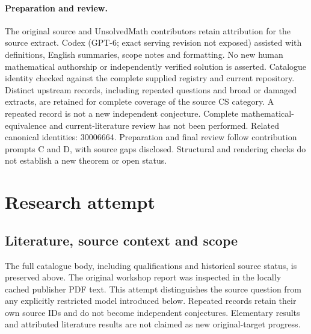 \documentclass[11pt]{article}
\begin{document}
\paragraph{Preparation and review.}
The original source and UnsolvedMath contributors retain attribution for the source extract. Codex (GPT-6; exact serving revision not exposed) assisted with definitions, English summaries, scope notes and formatting. No new human mathematical authorship or independently verified solution is asserted. Catalogue identity checked against the complete supplied registry and current repository. Distinct upstream records, including repeated questions and broad or damaged extracts, are retained for complete coverage of the source CS category. A repeated record is not a new independent conjecture. Complete mathematical-equivalence and current-literature review has not been performed. Related canonical identities: 30006664. Preparation and final review follow contribution prompts C and D, with source gaps disclosed. Structural and rendering checks do not establish a new theorem or open status.
\label{end:statement}

\section{Research attempt}
\subsection{Literature, source context and scope}
The full catalogue body, including qualifications and historical source status, is preserved above. The original workshop report was inspected in the locally cached publisher PDF text. This attempt distinguishes the source question from any explicitly restricted model introduced below. Repeated records retain their own source IDs and do not become independent conjectures. Elementary results and attributed literature results are not claimed as new original-target progress.
\end{document}
